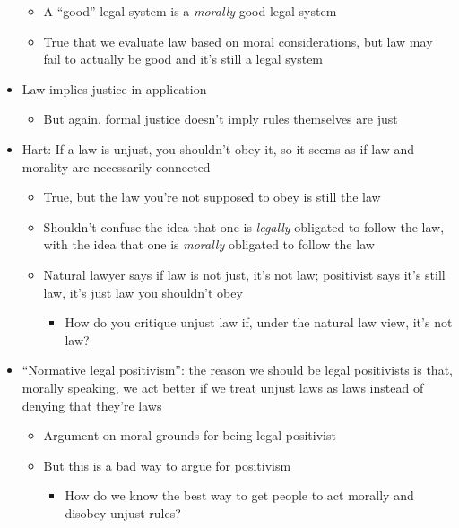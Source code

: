 \begin{itemize}
  \begin{itemize}
  \tightlist
  \item
    A ``good'' legal system is a \emph{morally} good legal system
  \item
    True that we evaluate law based on moral considerations, but law may
    fail to actually be good and it's still a legal system
  \end{itemize}
\item
  Law implies justice in application

  \begin{itemize}
  \tightlist
  \item
    But again, formal justice doesn't imply rules themselves are just
  \end{itemize}
\item
  Hart: If a law is unjust, you shouldn't obey it, so it seems as if law
  and morality are necessarily connected

  \begin{itemize}
  \tightlist
  \item
    True, but the law you're not supposed to obey is still the law
  \item
    Shouldn't confuse the idea that one is \emph{legally} obligated to
    follow the law, with the idea that one is \emph{morally} obligated
    to follow the law
  \item
    Natural lawyer says if law is not just, it's not law; positivist
    says it's still law, it's just law you shouldn't obey

    \begin{itemize}
    \tightlist
    \item
      How do you critique unjust law if, under the natural law view,
      it's not law?
    \end{itemize}
  \end{itemize}
\item
  ``Normative legal positivism'': the reason we should be legal
  positivists is that, morally speaking, we act better if we treat
  unjust laws as laws instead of denying that they're laws

  \begin{itemize}
  \tightlist
  \item
    Argument on moral grounds for being legal positivist
  \item
    But this is a bad way to argue for positivism

    \begin{itemize}
    \tightlist
    \item
      How do we know the best way to get people to act morally and
      disobey unjust rules?
    \end{itemize}
  \end{itemize}
\end{itemize}

